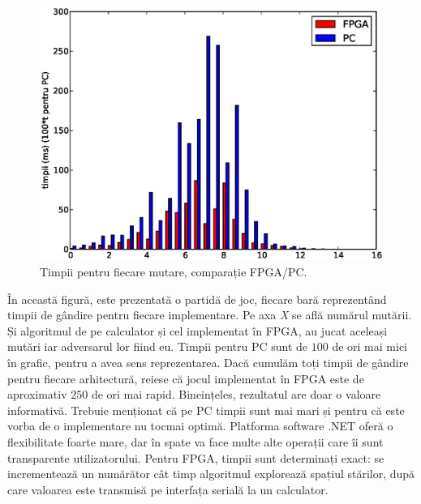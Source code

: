 \documentclass[11pt,twocolumn,a4paper]{article}
\begin{document}
\begin{figure}[h]
\includegraphics*[scale = 0.4]{concluzii.eps}
\caption{\small{Timpii pentru fiecare mutare, comparație FPGA/PC.}}
\label{fig:fig_joc}
\end{figure}

În această figură, este prezentată o partidă de joc, fiecare bară reprezentând timpii de gândire pentru fiecare implementare. Pe axa \emph{X} se află numărul mutării. Și algoritmul de pe calculator și cel implementat în FPGA, au jucat aceleași mutări iar adversarul lor fiind eu. Timpii pentru PC sunt de $100$ de ori mai mici în grafic, pentru a avea sens reprezentarea. Dacă cumulăm toți timpii de gândire pentru fiecare arhitectură, reiese că jocul implementat în FPGA este de aproximativ $250$ de ori mai rapid. Bineințeles, rezultatul are doar o valoare informativă. Trebuie menționat că pe PC timpii sunt mai mari și pentru că este vorba de o implementare nu tocmai optimă. Platforma software .NET oferă o flexibilitate foarte mare, dar în spate va face multe alte operații care îi sunt transparente utilizatorului. Pentru FPGA, timpii sunt determinați exact: se incrementează un numărător cât timp algoritmul explorează spațiul stărilor, după care valoarea este transmisă pe interfața serială la un calculator.





\end{document}

